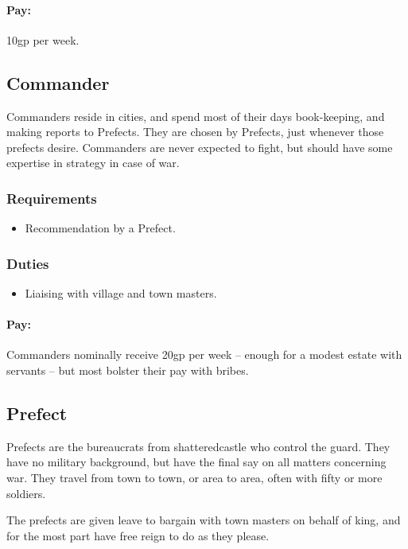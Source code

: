 \begin{multicols}{2}
\paragraph{Pay:}
10gp per week.

\subsection{Commander}

Commanders reside in cities, and spend most of their days book-keeping, and making reports to Prefects.
They are chosen by Prefects, just whenever those prefects desire.
Commanders are never expected to fight, but should have some expertise in strategy in case of war.

\subsubsection{Requirements}

\begin{itemize}
  \item
  Recommendation by a Prefect.
\end{itemize}

\subsubsection{Duties}

\begin{itemize}
  \item
  Liaising with village and town masters.
\end{itemize}

\paragraph{Pay:}
Commanders nominally receive 20gp per week -- enough for a modest estate with servants -- but most bolster their pay with bribes.

\subsection{Prefect}

Prefects are the bureaucrats from \gls{shatteredcastle} who control the \gls{guard}.
They have no military background, but have the final say on all matters concerning war.
They travel from town to town, or area to area, often with fifty or more soldiers.

The prefects are given leave to bargain with town masters on behalf of \gls{king}, and for the most part have free reign to do as they please.


\end{multicols}
